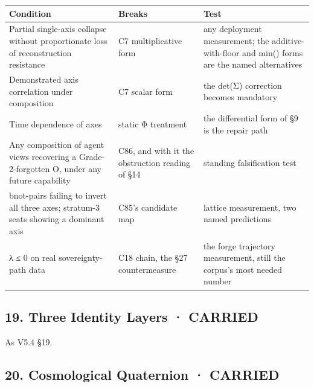 \documentclass[
  11pt,
]{article}
\newcounter{none} %
\begin{document}
{\def\LTcaptype{none} %
\begin{longtable}[]{@{}
  >{\raggedright\arraybackslash}p{}
  >{\raggedright\arraybackslash}p{}
  >{\raggedright\arraybackslash}p{}@{}}
\toprule\noalign{}
\begin{minipage}[b]{\linewidth}\raggedright
Condition
\end{minipage} & \begin{minipage}[b]{\linewidth}\raggedright
Breaks
\end{minipage} & \begin{minipage}[b]{\linewidth}\raggedright
Test
\end{minipage} \\
\midrule\noalign{}
\endhead
\bottomrule\noalign{}
\endlastfoot
Partial single-axis collapse without proportionate loss of
reconstruction resistance & C7 multiplicative form & any deployment
measurement; the additive-with-floor and min() forms are the named
alternatives \\
Demonstrated axis correlation under composition & C7 scalar form & the
det(Σ) correction becomes mandatory \\
Time dependence of axes & static Φ treatment & the differential form of
§9 is the repair path \\
Any composition of agent views recovering a Grade-2-forgotten O, under
any future capability & C86, and with it the obstruction reading of §14
& standing falsification test \\
bnot-pairs failing to invert all three axes; stratum-3 seats showing a
dominant axis & C85's candidate map & lattice measurement, two named
predictions \\
λ ≤ 0 on real sovereignty-path data & C18 chain, the §27 countermeasure
& the forge trajectory measurement, still the corpus's most needed
number \\
\end{longtable}
}

\subsection{19. Three Identity Layers ·
CARRIED}\label{three-identity-layers-carried}

As V5.4 §19.

\subsection{20. Cosmological Quaternion ·
CARRIED}\label{cosmological-quaternion-carried}
\end{document}
